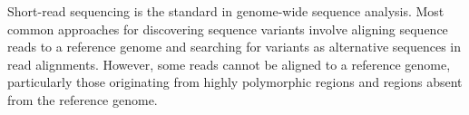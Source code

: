 Short-read sequencing is the standard in genome-wide sequence analysis. Most common approaches for discovering sequence variants involve aligning sequence reads to a reference genome \cite{li2009fast} and searching for variants as alternative sequences in read alignments. However, some reads cannot be aligned to a reference genome, particularly those originating from highly polymorphic regions and regions absent from the reference genome.\\

